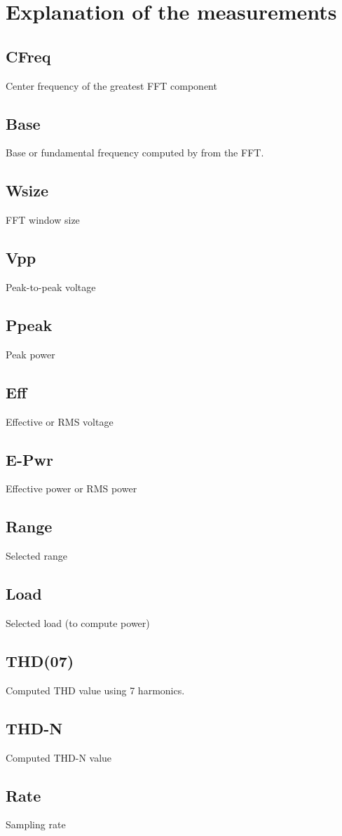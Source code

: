 \documentclass[10pt,a4paper]{article}
\begin{document}
\section{Explanation of the measurements}
\subsection{CFreq}
Center frequency of the greatest FFT component
\subsection{Base}
Base or fundamental frequency computed by from the FFT.
\subsection{Wsize}
FFT window size
\subsection{Vpp}
Peak-to-peak voltage
\subsection{Ppeak}
Peak power
\subsection{Eff}
Effective or RMS voltage
\subsection{E-Pwr}
Effective power or RMS power
\subsection{Range}
Selected range
\subsection{Load}
Selected load (to compute power)
\subsection{THD(07)}
Computed THD value using 7 harmonics.
\subsection{THD-N}
Computed THD-N value
\subsection{Rate}
Sampling rate
\end{document}
